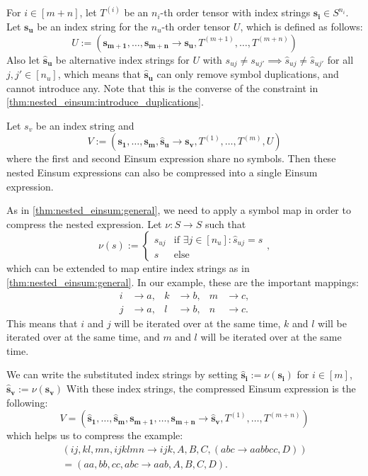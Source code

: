 \begin{theorem}
    \label{thm:nested_einsum:3}

    For $i \in [m + n]$, let $T^{(i)}$ be an $n_i$-th order tensor with index strings $\bm{s_i} \in S^{n_i}$.
    Let $\bm{s_u}$ be an index string for the $n_u$-th order tensor $U$, which is defined as follows:
    $$U := (\bm{s_{m + 1}},\dots,\bm{s_{m + n}} \rightarrow \bm{s_u}, T^{(m + 1)},\dots,T^{(m + n)})$$
    Also let $\bm{\hat{s}_u}$ be alternative index strings for $U$ with $s_{uj} \neq s_{uj'} \implies \hat{s}_{uj} \neq \hat{s}_{uj'}$ for all $j, j' \in [n_u]$,
    which means that $\bm{\hat{s}_u}$ can only remove symbol duplications, and cannot introduce any.
    Note that this is the converse of the constraint in \cref{thm:nested_einsum:introduce_duplications}.

    Let $s_v$ be an index string and
    $$V := (\bm{s_1},\dots,\bm{s_m}, \bm{\hat{s}_u} \rightarrow \bm{s_v}, T^{(1)},\dots,T^{(m)}, U)$$
    where the first and second Einsum expression share no symbols.
    Then these nested Einsum expressions can also be compressed into a single Einsum expression.

    As in \cref{thm:nested_einsum:general}, we need to apply a symbol map in order to compress the nested expression.
    Let $\nu: S \rightarrow S$ such that
    $$\nu(s) := \begin{cases}
            s_{uj} & \text{if }\exists j \in [n_u]: \hat{s}_{uj} = s \\
            s      & \text{else}
        \end{cases},$$
    which can be extended to map entire index strings as in \cref{thm:nested_einsum:general}.
    In our example, these are the important mappings:
    \begin{align*}
        i & \rightarrow a, & k & \rightarrow b, & m & \rightarrow c, \\
        j & \rightarrow a, & l & \rightarrow b, & n & \rightarrow c.
    \end{align*}
    This means that $i$ and $j$ will be iterated over at the same time, $k$ and $l$ will be iterated over at the same time, and $m$ and $l$ will be iterated over at the same time.

    We can write the substituted index strings by setting $\bm{\hat{s}_i} := \nu(\bm{s_i})$ for $i \in [m]$, $\bm{\hat{s}_v} := \nu(\bm{s_v})$
    With these index strings, the compressed Einsum expression is the following:
    $$V = (\bm{\hat{s}_1},\dots,\bm{\hat{s}_m}, \bm{s_{m + 1}}, \dots, \bm{s_{m + n}} \rightarrow \bm{\hat{s}_v}, T^{(1)},\dots,T^{(m + n)})$$
    which helps us to compress the example:
    \begin{gather*}
        (ij, kl, mn, ijklmn \rightarrow ijk, A, B, C, (abc \rightarrow aabbcc, D))\\
        = (aa, bb, cc, abc \rightarrow aab, A, B, C, D).
    \end{gather*}
\end{theorem}

